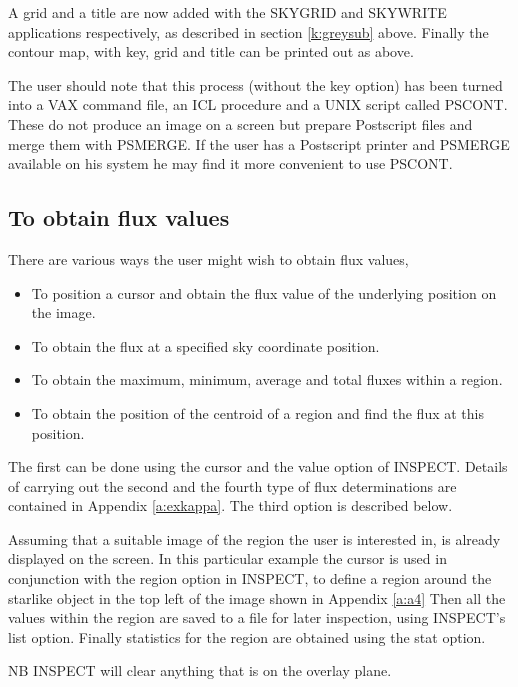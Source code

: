 A grid and a title are now added with the SKYGRID and SKYWRITE applications
respectively, as described in section \ref {k:greysub} above. Finally the
contour map, with key, grid and title can be printed out as above.

The user should note that this process (without the key option) has been turned
into a VAX command file, an ICL procedure and a UNIX script called PSCONT.
These do not produce an image on a screen but prepare Postscript files and merge
them with PSMERGE. If the user has a Postscript printer and PSMERGE
available on his system he may find it more convenient to use PSCONT.

\subsection{To obtain flux values}
\label{k:flux}
There are various ways the user might wish to obtain flux values, 
\begin{itemize}
\item To position a cursor and obtain the flux value of the underlying 
position on the image.
\item To obtain the flux at a specified sky coordinate position.
\item To obtain the maximum, minimum, average and total fluxes within a region.
\item To obtain the position of the centroid of a region and find the flux at 
this position.
\end{itemize}
The first can be done using the cursor and the value option of INSPECT. Details
of carrying out the second and the fourth type of flux determinations are
contained in Appendix \ref{a:exkappa}. The third option is described below.

Assuming that a suitable image of the region the user is interested in, is 
already displayed on the screen. In this particular example the cursor is used
in conjunction with the region option in INSPECT, to define a region around
the starlike object in the top left of the image shown in Appendix \ref{a:a4}
Then all the values within the region are saved to a file for later inspection,
using INSPECT's list option. Finally statistics for the region are obtained
using the stat option.

NB INSPECT will clear anything that is on the overlay plane.


